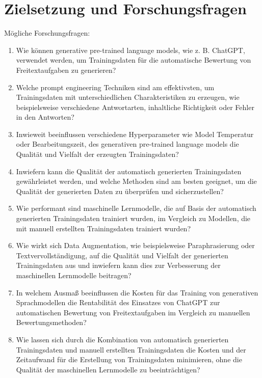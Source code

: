 \section{Zielsetzung und Forschungsfragen}
\label{sec:Questions}

Mögliche Forschungsfragen:

\begin{enumerate}
\item Wie können generative pre-trained language models, wie z. B. ChatGPT, verwendet werden, um Trainingsdaten für die automatische Bewertung von Freitextaufgaben zu generieren?
\item Welche prompt engineering Techniken sind am effektivsten, um Trainingsdaten mit unterschiedlichen Charakteristiken zu erzeugen, wie beispielsweise verschiedene Antwortarten, inhaltliche Richtigkeit oder Fehler in den Antworten?
\item Inwieweit beeinflussen verschiedene Hyperparameter wie Model Temperatur oder Bearbeitungszeit, des generativen pre-trained language models die Qualität und Vielfalt der erzeugten Trainingsdaten?
\item Inwiefern kann die Qualität der automatisch generierten Trainingsdaten gewährleistet werden, und welche Methoden sind am besten geeignet, um die Qualität der generierten Daten zu überprüfen und sicherzustellen?
\item Wie performant sind maschinelle Lernmodelle, die auf Basis der automatisch generierten Trainingsdaten trainiert wurden, im Vergleich zu Modellen, die mit manuell erstellten Trainingsdaten trainiert wurden?
\item Wie wirkt sich Data Augmentation, wie beispielsweise Paraphrasierung oder Textvervollständigung, auf die Qualität und Vielfalt der generierten Trainingsdaten aus und inwiefern kann dies zur Verbesserung der maschinellen Lernmodelle beitragen?
\item In welchem Ausmaß beeinflussen die Kosten für das Training von generativen Sprachmodellen die Rentabilität des Einsatzes von ChatGPT zur automatischen Bewertung von Freitextaufgaben im Vergleich zu manuellen Bewertungsmethoden?
\item Wie lassen sich durch die Kombination von automatisch generierten Trainingsdaten und manuell erstellten Trainingsdaten die Kosten und der Zeitaufwand für die Erstellung von Trainingsdaten minimieren, ohne die Qualität der maschinellen Lernmodelle zu beeinträchtigen?
\end{enumerate}